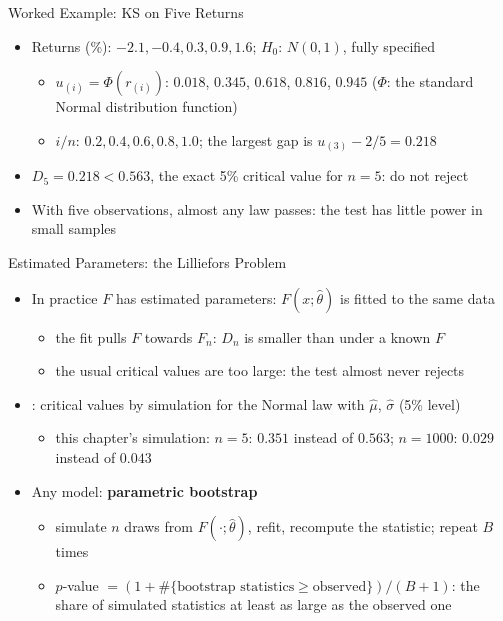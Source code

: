 \begin{frame}{Worked Example: KS on Five Returns}
\itemsize{\small}
\begin{itemize}
    \item Returns (\%): $-2.1, -0.4, 0.3, 0.9, 1.6$; $H_0$: $N(0, 1)$, fully specified
    \begin{itemize}
        \item $u_{(i)} = \Phi(r_{(i)})$: $0.018$, $0.345$, $0.618$, $0.816$, $0.945$ ($\Phi$: the standard Normal distribution function)
        \item $i/n$: $0.2, 0.4, 0.6, 0.8, 1.0$; the largest gap is $u_{(3)} - 2/5 = 0.218$
    \end{itemize}
    \item $D_5 = 0.218 < 0.563$, the exact 5\% critical value for $n = 5$: do not reject
    \item With five observations, almost any law passes: the test has little power in small samples
\end{itemize}
\end{frame}

\begin{frame}{Estimated Parameters: the Lilliefors Problem}
\itemsize{\small}
\begin{itemize}
    \item In practice $F$ has estimated parameters: $F(x; \hat\theta)$ is fitted to the same data
    \begin{itemize}
        \item the fit pulls $F$ towards $F_n$: $D_n$ is smaller than under a known $F$
        \item the usual critical values are too large: the test almost never rejects
    \end{itemize}
    \item {}: critical values by simulation for the Normal law with $\hat\mu$, $\hat\sigma$ (5\% level)
    \begin{itemize}
        \item this chapter's simulation: $n = 5$: $0.351$ instead of $0.563$; $n = 1000$: $0.029$ instead of $0.043$
    \end{itemize}
    \item Any model: \textbf{parametric bootstrap} 
    \begin{itemize}
        \item simulate $n$ draws from $F(\cdot; \hat\theta)$, refit, recompute the statistic; repeat $B$ times
        \item $p$-value $= (1 + \#\{\text{bootstrap statistics} \ge \text{observed}\})/(B + 1)$: the share of simulated statistics at least as large as the observed one
    \end{itemize}
\end{itemize}
\end{frame}

